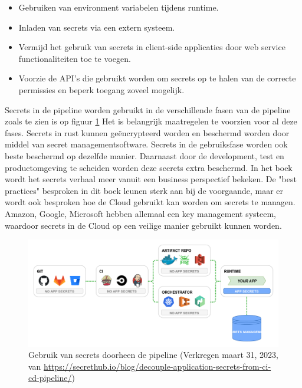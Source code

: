 \begin{itemize}
  \item Gebruiken van environment variabelen tijdens runtime.
  \item Inladen van secrets via een extern systeem.
  \item Vermijd het gebruik van secrets in client-side applicaties door web service functionaliteiten toe te voegen.
  \item Voorzie de API's die gebruikt worden om secrets op te halen van de correcte permissies en beperk toegang zoveel mogelijk.
\end{itemize}

Secrets in de pipeline worden gebruikt in de verschillende fasen van de pipeline zoals te zien is op figuur \ref{fig:Pipelinesecrets} Het is belangrijk maatregelen te voorzien voor al deze fases. Secrets in rust kunnen geëncrypteerd worden en beschermd worden door middel van secret managementsoftware. Secrets in de gebruiksfase worden ook beste beschermd op dezelfde manier. Daarnaast door de development, test en productomgeving te scheiden worden deze secrets extra beschermd.\autocite{Basak2022} In het boek \textcite{Calles2020} wordt het secrets verhaal meer vanuit een business perspectief bekeken. De "best practices" besproken in dit boek leunen sterk aan bij de voorgaande, maar er wordt ook besproken hoe de Cloud gebruikt kan worden om secrets te managen. Amazon, Google, Microsoft hebben allemaal een key management systeem, waardoor secrets in de Cloud op een veilige manier gebruikt kunnen worden.

\begin{figure}[H]
  \centering
  \includegraphics[scale=0.4]{graphics/Pipelinesecrets.png}
  \caption{\label{fig:Pipelinesecrets}Gebruik van secrets doorheen de pipeline (Verkregen maart 31, 2023, van \url{https://secrethub.io/blog/decouple-application-secrets-from-ci-cd-pipeline/})}
\end{figure}

